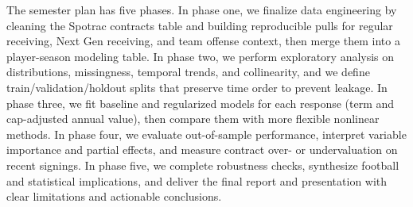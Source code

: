 \documentclass[10pt]{extarticle}
\begin{document}
\noindent The semester plan has five phases. In phase one, we finalize data engineering by cleaning the Spotrac contracts table and building reproducible pulls for regular receiving, Next Gen receiving, and team offense context, then merge them into a player-season modeling table. In phase two, we perform exploratory analysis on distributions, missingness, temporal trends, and collinearity, and we define train/validation/holdout splits that preserve time order to prevent leakage. In phase three, we fit baseline and regularized models for each response (term and cap-adjusted annual value), then compare them with more flexible nonlinear methods. In phase four, we evaluate out-of-sample performance, interpret variable importance and partial effects, and measure contract over- or undervaluation on recent signings. In phase five, we complete robustness checks, synthesize football and statistical implications, and deliver the final report and presentation with clear limitations and actionable conclusions.
\end{document}
